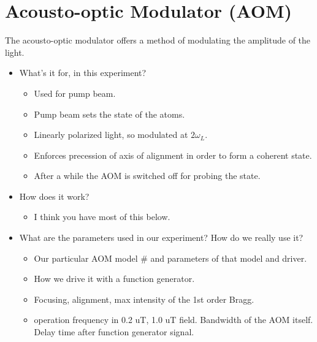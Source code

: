 \section{Acousto-optic Modulator (AOM)}

The acousto-optic modulator offers a method of modulating the
amplitude of the light.

\begin{itemize}
\item What's it for, in this experiment?
\begin{itemize}
\item Used for pump beam.
\item Pump beam sets the state of the atoms.
\item Linearly polarized light, so modulated at $2\omega_L$.
\item Enforces precession of axis of alignment in order to form a
  coherent state.
\item After a while the AOM is switched off for probing the state.
\end{itemize}
\item How does it work?
\begin{itemize}
\item I think you have most of this below.
\end{itemize}
\item What are the parameters used in our experiment?  How do we
  really use it?
\begin{itemize}
\item Our particular AOM model \# and parameters of that model and
  driver.
\item How we drive it with a function generator.
\item Focusing, alignment, max intensity of the 1st order Bragg.
\item operation frequency in 0.2 uT, 1.0 uT field.  Bandwidth of the
  AOM itself.  Delay time after function generator signal.
\end{itemize}
\end{itemize}






